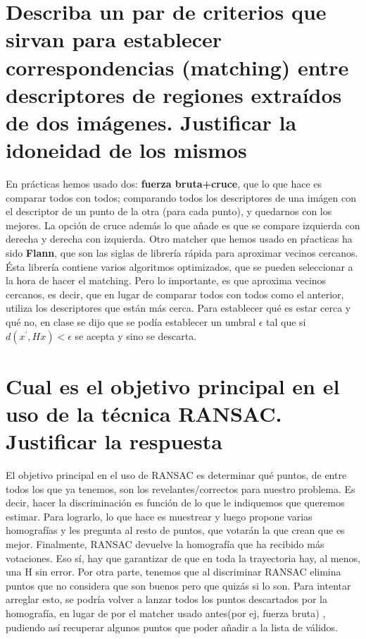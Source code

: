\section{Describa un par de criterios que sirvan para establecer correspondencias
(matching) entre descriptores de regiones extraídos de dos imágenes. Justificar
la idoneidad de los mismos}
En prácticas hemos usado dos: \textbf{fuerza bruta+cruce}, que lo que hace es comparar todos con todos; comparando todos los descriptores
de una imágen con el descriptor de un punto de la otra (para cada punto), y quedarnos con los mejores. La opción de cruce además lo que añade
es que se compare izquierda con derecha y derecha con izquierda.
\newline
Otro matcher que hemos usado en pŕacticas ha sido \textbf{Flann}, que son las siglas de librería rápida para aproximar vecinos cercanos.\newline
Ésta librería contiene varios algoritmos optimizados, que se pueden seleccionar a la hora de hacer el matching. Pero lo importante,
es que aproxima vecinos cercanos, es decir, que en lugar de comparar todos con todos como el anterior, utiliza los descriptores que
están más cerca. Para establecer qué es estar cerca y qué no, en clase se dijo que se podía establecer un umbral $\epsilon$ tal que si
$d(x^{'},Hx)< \epsilon $ se acepta y sino se descarta. \newline

\section{Cual es el objetivo principal en el uso de la técnica RANSAC. Justificar
la respuesta}
El objetivo principal en el uso de RANSAC es determinar qué puntos, de entre todos los que ya tenemos, son
los revelantes/correctos para nuestro problema. Es decir, hacer la discriminación es función de lo que le indiquemos que
queremos estimar. \newline
Para lograrlo, lo que hace es muestrear y luego propone varias homografías y les pregunta al resto de puntos, que
votarán la que crean que es mejor. Finalmente, RANSAC devuelve la homografía que ha recibido más votaciones. \newline
Eso sí, hay que garantizar de que en toda la trayectoria hay, al menos, una H sin error. \newline
Por otra parte, tenemos que al discriminar RANSAC elimina puntos que no considera que son buenos pero que quizás si lo son.
Para intentar arreglar esto, se podría volver a lanzar todos los puntos descartados por la homografía, en lugar de por el matcher
usado antes(por ej, fuerza bruta) , pudiendo así recuperar algunos puntos que poder añadir a la lista de válidos.
